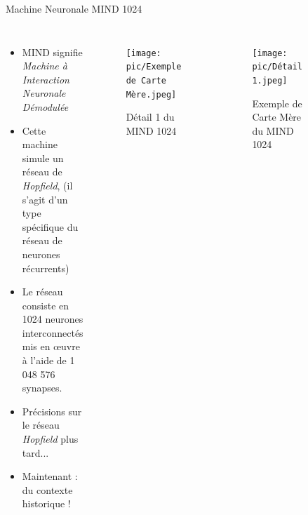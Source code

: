 \documentclass{beamer}
\begin{document}
\begin{frame}{Machine Neuronale MIND 1024}
    \begin{columns}[T]
            \scriptsize
            \begin{itemize}[<+-| alert@+>] %
                \item MIND signifie \textit{Machine à Interaction Neuronale Démodulée}
                \item Cette machine simule un réseau de \textit{Hopfield}, (il s'agit d'un type spécifique du réseau de neurones récurrents)
                \item Le réseau consiste en 1024 neurones interconnectés mis en \oe uvre à l'aide de 1 048 576 synapses.
                \item Précisions sur le réseau \textit{Hopfield} plus tard...
                \item Maintenant : du contexte historique !
            \end{itemize}
            \begin{columns}[T]
                    \begin{figure}
                    \centering
                    \texttt{[image: pic/Exemple de Carte Mère.jpeg]}
                    \caption{Détail 1 du MIND 1024}
                    \end{figure}
                    \begin{figure}
                    \centering
                    \texttt{[image: pic/Détail 1.jpeg]}
                    \caption{Exemple de Carte Mère du MIND 1024}
                    \end{figure}
            \end{columns}
            \begin{figure}
            \centering

\end{figure}
\end{columns}
\end{frame}
\end{document}
